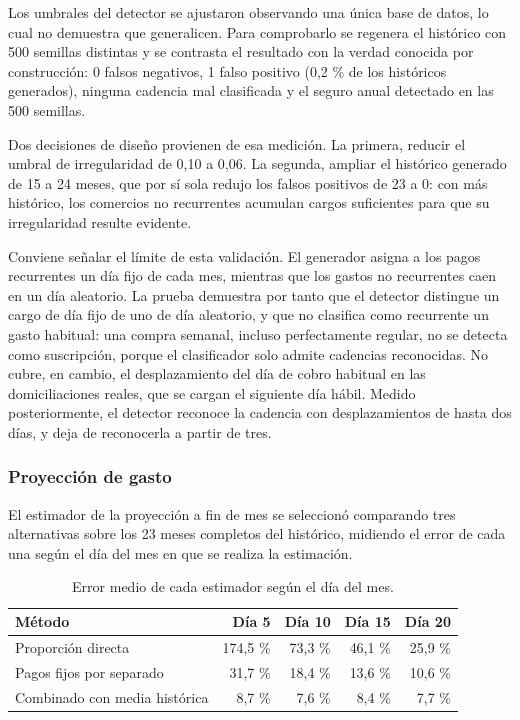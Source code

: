 Los umbrales del detector se ajustaron observando una única base de datos, lo
cual no demuestra que generalicen. Para comprobarlo se regenera el histórico con
500 semillas distintas y se contrasta el resultado con la verdad conocida por
construcción: 0 falsos negativos, 1 falso positivo (0,2 \% de los históricos
generados), ninguna cadencia mal clasificada y el seguro anual detectado en las
500 semillas.

Dos decisiones de diseño provienen de esa medición. La primera, reducir el
umbral de irregularidad de 0,10 a 0,06. La segunda, ampliar el histórico
generado de 15 a 24 meses, que por sí sola redujo los falsos positivos de 23 a
0: con más histórico, los comercios no recurrentes acumulan cargos suficientes
para que su irregularidad resulte evidente.

Conviene señalar el límite de esta validación. El generador asigna a los pagos
recurrentes un día fijo de cada mes, mientras que los gastos no recurrentes caen
en un día aleatorio. La prueba demuestra por tanto que el detector distingue un
cargo de día fijo de uno de día aleatorio, y que no clasifica como recurrente un
gasto habitual: una compra semanal, incluso perfectamente regular, no se detecta
como suscripción, porque el clasificador solo admite cadencias reconocidas. No
cubre, en cambio, el desplazamiento del día de cobro habitual en las
domiciliaciones reales, que se cargan el siguiente día hábil. Medido
posteriormente, el detector reconoce la cadencia con desplazamientos de hasta
dos días, y deja de reconocerla a partir de tres.

\subsubsection{Proyección de gasto}

El estimador de la proyección a fin de mes se seleccionó comparando tres
alternativas sobre los 23 meses completos del histórico, midiendo el error de
cada una según el día del mes en que se realiza la estimación.

\begin{table}[h]
\centering
\begin{tabular}{lrrrr}
\toprule
\textbf{Método} & \textbf{Día 5} & \textbf{Día 10} & \textbf{Día 15} & \textbf{Día 20} \\
\midrule
Proporción directa            & 174,5 \% & 73,3 \% & 46,1 \% & 25,9 \% \\
Pagos fijos por separado      & 31,7 \%  & 18,4 \% & 13,6 \% & 10,6 \% \\
Combinado con media histórica & 8,7 \%   & 7,6 \%  & 8,4 \%  & 7,7 \% \\
\bottomrule
\end{tabular}
\caption{Error medio de cada estimador según el día del mes.}
\end{table}

